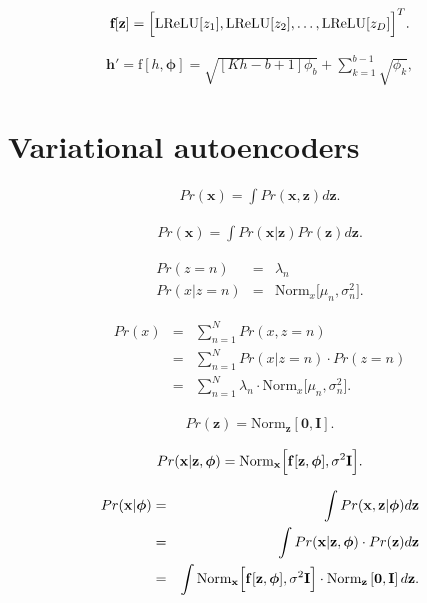 \documentclass[letterpaper,twoside,openany, titlepage,oldfontcommands,titles,dvipsnames]{memoir}
\begin{document}
\begin{eqnarray}
 \mbox{\bf f}[\mathbf{z}] = \Bigl[\mbox{LReLU}[z_{1}], \mbox{LReLU}[z_{2}], \ldots, \mbox{LReLU}[z_{D}]\Bigr]^{T}.
 \end{eqnarray}

\begin{eqnarray}
 \mathbf{h}' = \mbox{f}[h,\boldsymbol\phi] = \sqrt{\left[Kh-b+1\right]\phi_{b}} + \sum_{k=1}^{b-1}\sqrt{\phi_{k}},
 \end{eqnarray}

 \chapter{Variational autoencoders}

\begin{eqnarray}
  Pr(\mathbf{x}) = \int Pr(\mathbf{x}, \mathbf{z}) d\mathbf{z}.
 \end{eqnarray}

\begin{eqnarray}\label{eq:vae_latent_abstract}
  Pr(\mathbf{x}) = \int Pr(\mathbf{x} | \mathbf{z}) Pr(\mathbf{z}) d\mathbf{z}.
 \end{eqnarray}

\begin{eqnarray}
  Pr(z=n) &=& \lambda_{n}\nonumber \\
  Pr(x |z = n) &=& \mbox{Norm}_{x}\bigl[\mu_{n},\sigma^2_{n}\bigr].\label{eq:vae_mog_like_prior}
 \end{eqnarray}

\begin{eqnarray}\label{eq:vae_mog_marg}
  Pr(x) &=& \sum_{n=1}^{N} Pr(x, z=n) \nonumber \\
  &=& \sum_{n=1}^{N} Pr(x| z=n) \cdot Pr(z=n)\nonumber \\
  &=& \sum_{n=1}^{N} \lambda_{n}\cdot \mbox{Norm}_{x}\bigl[\mu_{n},\sigma^2_{n}\bigr].
 \end{eqnarray}

\begin{eqnarray}
  Pr(\mathbf{z}) = \mbox{Norm}_{\mathbf{z}}[\mathbf{0},\mathbf{I}].
 \end{eqnarray}

\begin{eqnarray}\label{eq:vae_intro_likelihood}
  Pr(\mathbf{x} |\mathbf{z},\boldsymbol\phi) = \mbox{Norm}_{\mathbf{x}}\Bigl[\mathbf{f}[\mathbf{z},\boldsymbol\phi],\sigma^{2}\mathbf{I}\Bigr].
 \end{eqnarray}

\begin{eqnarray}\label{eq:vae_nonlin_like_int}
  Pr(\mathbf{x}|\boldsymbol\phi) &=& \int Pr(\mathbf{x}, \mathbf{z}|\boldsymbol\phi) d\mathbf{z} \nonumber \\
  &=& \int Pr(\mathbf{x}| \mathbf{z},\boldsymbol\phi) \cdot Pr(\mathbf{z})d\mathbf{z}\nonumber \\
  &=& \int \mbox{Norm}_{\mathbf{x}}\Bigl[\mathbf{f}[\mathbf{z},\boldsymbol\phi],\sigma^{2}\mathbf{I}\Bigr]\cdot \mbox{Norm}_{\mathbf{z}}\left[\mathbf{0},\mathbf{I}\right]d\mathbf{z}.
 \end{eqnarray}
\end{document}
